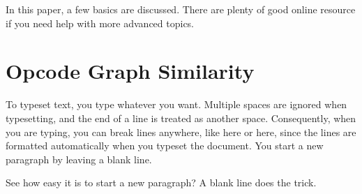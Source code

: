 In this paper, a few basics are discussed. There are plenty of good online resource
if you need help with more advanced topics.


\section{Opcode Graph Similarity} 

To typeset text, you type whatever you want. Multiple spaces are
ignored                           when typesetting, and
the end of a line is treated as another space.
Consequently, when you are typing, you can break lines anywhere, like here
or here,
since the lines are formatted automatically when you typeset the document.
You start a new paragraph by leaving a blank line.

See how easy it is to start a new paragraph? A blank line does the trick.


